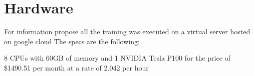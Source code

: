 \documentclass[11pt]{article}
\begin{document}
\section{Hardware}
\label{sec:org3ed0c2d}

For information propose all the training was executed on a virtual server
hosted on google cloud
The specs are the following:

8 CPUs with 60GB of memory and 1 NVIDIA Tesla P100 for the price of \$1490.51
per month at a rate of 2.042 per hour













\end{document}
